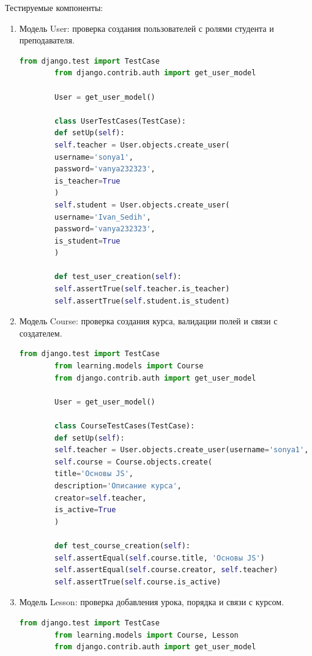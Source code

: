 Тестируемые компоненты:
\begin{enumerate}
	\item Модель User: проверка создания пользователей с ролями студента и преподавателя.
	\begin{lstlisting}[language=Python, caption=Модульный тест для User, label=lst:user_test]
		from django.test import TestCase
		from django.contrib.auth import get_user_model
		
		User = get_user_model()
		
		class UserTestCases(TestCase):
		def setUp(self):
		self.teacher = User.objects.create_user(
		username='sonya1',
		password='vanya232323',
		is_teacher=True
		)
		self.student = User.objects.create_user(
		username='Ivan_Sedih',
		password='vanya232323',
		is_student=True
		)
		
		def test_user_creation(self):
		self.assertTrue(self.teacher.is_teacher)
		self.assertTrue(self.student.is_student)
	\end{lstlisting}
	
	\item Модель Course: проверка создания курса, валидации полей и связи с создателем.
	\begin{lstlisting}[language=Python, caption=Модульный тест для Course, label=lst:course_test]
		from django.test import TestCase
		from learning.models import Course
		from django.contrib.auth import get_user_model
		
		User = get_user_model()
		
		class CourseTestCases(TestCase):
		def setUp(self):
		self.teacher = User.objects.create_user(username='sonya1', password='vanya232323', is_teacher=True)
		self.course = Course.objects.create(
		title='Основы JS',
		description='Описание курса',
		creator=self.teacher,
		is_active=True
		)
		
		def test_course_creation(self):
		self.assertEqual(self.course.title, 'Основы JS')
		self.assertEqual(self.course.creator, self.teacher)
		self.assertTrue(self.course.is_active)
	\end{lstlisting}
	
	\item Модель Lesson: проверка добавления урока, порядка и связи с курсом.
	\begin{lstlisting}[language=Python, caption=Модульный тест для Lesson, label=lst:lesson_test]
		from django.test import TestCase
		from learning.models import Course, Lesson
		from django.contrib.auth import get_user_model
		

\end{lstlisting}
\end{enumerate}

